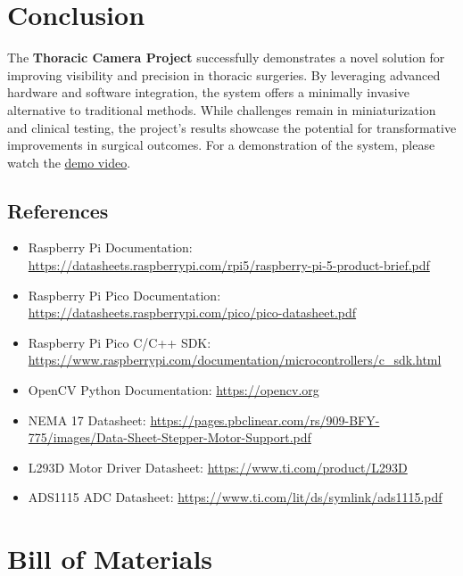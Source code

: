 \section{Conclusion}
The \textbf{Thoracic Camera Project} successfully demonstrates a novel solution for improving visibility and precision in thoracic surgeries. By leveraging advanced hardware and software integration, the system offers a minimally invasive alternative to traditional methods. While challenges remain in miniaturization and clinical testing, the project's results showcase the potential for transformative improvements in surgical outcomes. For a demonstration of the system, please watch the \href{https://youtu.be/UekYdXSXzXo}{demo video}.

\subsection{References}
\begin{itemize}
    \item Raspberry Pi Documentation: \url{https://datasheets.raspberrypi.com/rpi5/raspberry-pi-5-product-brief.pdf}
    \item Raspberry Pi Pico Documentation: \url{https://datasheets.raspberrypi.com/pico/pico-datasheet.pdf}
    \item Raspberry Pi Pico C/C++ SDK: \url{https://www.raspberrypi.com/documentation/microcontrollers/c_sdk.html}
    \item OpenCV Python Documentation: \url{https://opencv.org}
    \item NEMA 17 Datasheet: \url{https://pages.pbclinear.com/rs/909-BFY-775/images/Data-Sheet-Stepper-Motor-Support.pdf}
    \item L293D Motor Driver Datasheet: \url{https://www.ti.com/product/L293D}
    \item ADS1115 ADC Datasheet: \url{https://www.ti.com/lit/ds/symlink/ads1115.pdf}
\end{itemize}

\section{Bill of Materials}

